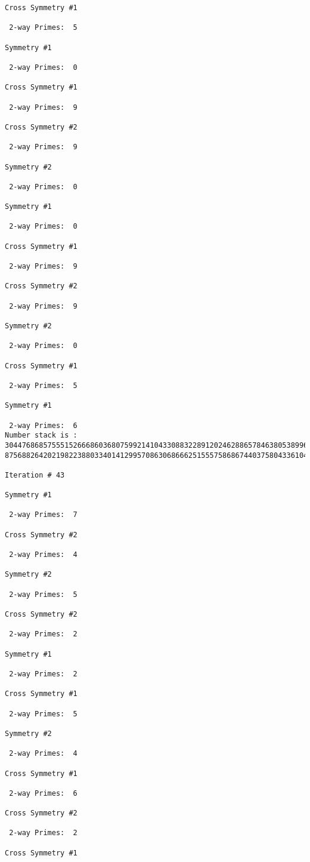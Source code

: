 {{{{\begin{verbatim}
Cross Symmetry #1

 2-way Primes: 	5

Symmetry #1

 2-way Primes: 	0

Cross Symmetry #1

 2-way Primes: 	9

Cross Symmetry #2

 2-way Primes: 	9

Symmetry #2

 2-way Primes: 	0

Symmetry #1

 2-way Primes: 	0

Cross Symmetry #1

 2-way Primes: 	9

Cross Symmetry #2

 2-way Primes: 	9

Symmetry #2

 2-way Primes: 	0

Cross Symmetry #1

 2-way Primes: 	5

Symmetry #1

 2-way Primes: 	6
Number stack is :
30447686857555152666860368075992141043308832289120246288657846380538996794608835958544046240163340857
87568826420219822388033401412995708630686662515557586867440375804336104264044585953880649769983508364

Iteration #	43

Symmetry #1

 2-way Primes: 	7

Cross Symmetry #2

 2-way Primes: 	4

Symmetry #2

 2-way Primes: 	5

Cross Symmetry #2

 2-way Primes: 	2

Symmetry #1

 2-way Primes: 	2

Cross Symmetry #1

 2-way Primes: 	5

Symmetry #2

 2-way Primes: 	4

Cross Symmetry #1

 2-way Primes: 	6

Cross Symmetry #2

 2-way Primes: 	2

Cross Symmetry #1


\end{verbatim}}}}}
